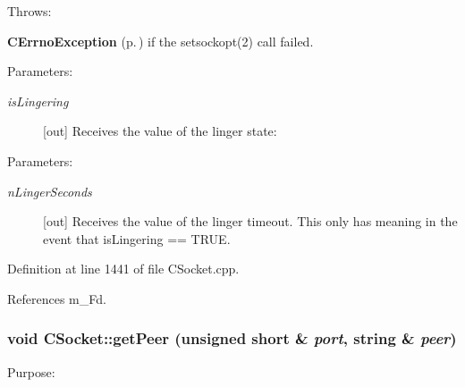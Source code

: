Throws:\begin{CompactItemize}
\item 
{\bf CErrno\-Exception} {\rm (p.\,\pageref{classCErrnoException})} if the setsockopt(2) call failed.\end{CompactItemize}
\begin{Desc}
\item[Parameters: ]\par
\begin{description}
\item[{\em 
is\-Lingering}][out] Receives the value of the linger state:
\end{description}
\end{Desc}
\begin{Desc}
\item[Parameters: ]\par
\begin{description}
\item[{\em 
n\-Linger\-Seconds}][out] Receives the value of the linger timeout. This only has meaning in the event that is\-Lingering == TRUE. \end{description}
\end{Desc}


Definition at line 1441 of file CSocket.cpp.

References m\_\-Fd.
\subsubsection{\setlength{\rightskip}{0pt plus 5cm}void CSocket::get\-Peer (unsigned short \& {\em port}, string \& {\em peer})}\label{classCSocket_a13}


Purpose:

